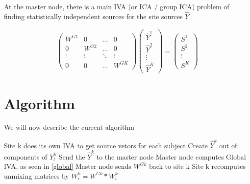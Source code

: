 \documentclass{amsproc}
\begin{document}
At the master node, there is a main IVA (or ICA / group ICA) problem of finding statistically independent sources for the site sources $\hat{Y}$
        
\begin{align} \label{global}
    \begin{pmatrix}
        W^{G1}  & 0         & \dots     & 0         \\
        0       & W^{G2}    & \dots     & 0         \\
        \vdots  & \vdots    & \ddots    & \vdots    \\
        0       & 0         & \dots     & W^{GK}
    \end{pmatrix}
    \begin{pmatrix}
        \hat{Y}^1   \\
        \hat{Y}^2   \\
        \vdots      \\
        \hat{Y}^K
    \end{pmatrix}
    =
    \begin{pmatrix}
        S^1     \\
        S^2     \\
        \vdots  \\
        S^K
    \end{pmatrix}
\end{align}

\pagebreak

\section{Algorithm} We will now describe the current algorithm


\begin{algorithmic}
 
    \State Site k does its own IVA to get source vetors for each subject
    \State Create $\hat{Y}^k$ out of components of $Y^k_l$
    \State Send the $\hat{Y}^k$ to the master node
\EndFor
\State Master node computes Global IVA, as seen in \ref{global}
\State Master node sends $W^{Gk}$ back to site k
    \State Site k recomputes unmixing matrices by $W^k_i = W^{Gk} * W^k_i$
\end{algorithmic}
\end{document}
